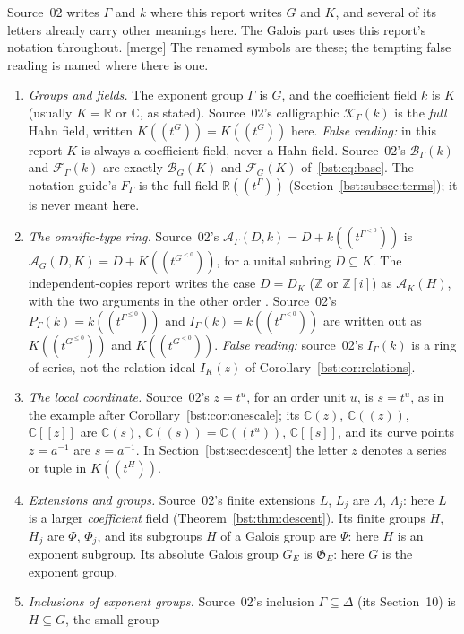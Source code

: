 \documentclass[11pt,letterpaper]{article}
\theoremstyle{definition}
\theoremstyle{remark}
\newcommand{\R}{\mathbb R}
\newcommand{\C}{\mathbb C}
\newcommand{\Z}{\mathbb Z}
\newcommand{\HH}[2]{#1((t^{#2}))}
\newcommand{\BB}[2]{\mathcal B_{#2}(#1)}
\newcommand{\FF}[2]{\mathcal F_{#2}(#1)}
\newcommand{\AbsGal}[1]{\mathfrak G_{#1}}
\newcommand{\AAG}[3]{\mathcal A_{#3}(#1,#2)}
\begin{document}
Source~02 writes $\Gamma$ and $k$ where this report writes $G$ and $K$, and
several of its letters already carry other meanings here. The Galois part
uses this report's notation throughout. \textup{[merge]} The renamed symbols
are these; the tempting false reading is named where there is one.
\begin{enumerate}
\item \emph{Groups and fields.} The exponent group $\Gamma$ is $G$, and the
coefficient field $k$ is $K$ (usually $K=\R$ or $\C$, as stated). Source~02's
calligraphic $\mathcal K_\Gamma(k)$ is the \emph{full} Hahn field, written
$\HH KG=K((t^G))$ here. \emph{False reading:} in this report $K$ is always a
coefficient field, never a Hahn field. Source~02's $\mathcal B_\Gamma(k)$ and
$\mathcal F_\Gamma(k)$ are exactly $\BB KG$ and $\FF KG$ of~\eqref{bst:eq:base}.
The notation guide's $F_\Gamma$ is the full field $\R((t^\Gamma))$
(Section~\ref{bst:subsec:terms}); it is never meant here.
\item \emph{The omnific-type ring.} Source~02's $\mathcal A_\Gamma(D,k)=D+k((t^{\Gamma^{<0}}))$
is $\AAG DKG=D+K((t^{G^{<0}}))$, for a unital subring $D\subseteq K$.
The independent-copies report writes the case $D=D_K$ ($\Z$ or $\Z[i]$) as
$\mathcal A_K(H)$, with the two arguments in the other order \cite{RepoIsc}.
Source~02's $P_\Gamma(k)=k((t^{\Gamma^{\le0}}))$ and $I_\Gamma(k)=k((t^{\Gamma^{<0}}))$
are written out as $K((t^{G^{\le0}}))$ and $K((t^{G^{<0}}))$. \emph{False
reading:} source~02's $I_\Gamma(k)$ is a ring of series, not the relation
ideal $I_K(z)$ of Corollary~\ref{bst:cor:relations}.
\item \emph{The local coordinate.} Source~02's $z=t^u$, for an order unit
$u$, is $s=t^u$, as in the example after Corollary~\ref{bst:cor:onescale};
its $\C(z)$, $\C((z))$, $\C[[z]]$ are $\C(s)$, $\C((s))=\C((t^u))$,
$\C[[s]]$, and its curve points $z=a^{-1}$ are $s=a^{-1}$. In
Section~\ref{bst:sec:descent} the letter $z$ denotes a series or tuple in $\HH KH$.
\item \emph{Extensions and groups.} Source~02's finite extensions $L$, $L_j$
are $\Lambda$, $\Lambda_j$: here $L$ is a larger \emph{coefficient} field
(Theorem~\ref{bst:thm:descent}). Its finite groups $H$, $H_j$ are $\Phi$,
$\Phi_j$, and its subgroups $H$ of a Galois group are $\Psi$: here $H$ is an
exponent subgroup. Its absolute Galois group $G_E$ is $\AbsGal E$: here $G$ is
the exponent group.
\item \emph{Inclusions of exponent groups.} Source~02's inclusion
$\Gamma\subseteq\Delta$ (its Section~10) is $H\subseteq G$, the small group

\end{enumerate}
\end{document}

